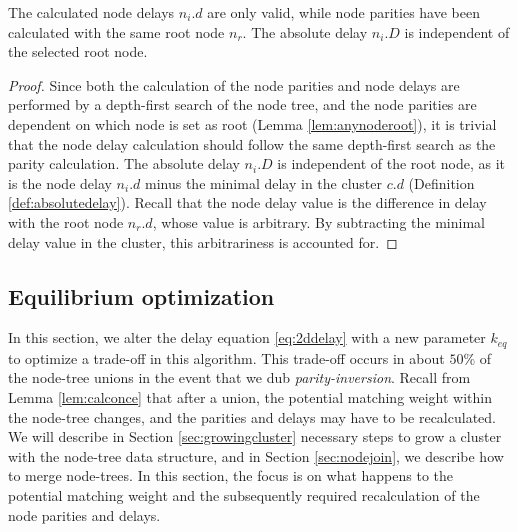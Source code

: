\begin{lemma}\label{lem:nodecalc_ancestrypath}
  The calculated node delays $n_i.d$ are only valid, while node parities have been calculated with the same root node $n_r$. The absolute delay $n_i.D$ is independent of the selected root node. 
\end{lemma}
\begin{proof}
  Since both the calculation of the node parities and node delays are performed by a depth-first search of the node tree, and the node parities are dependent on which node is set as root (Lemma \ref{lem:anynoderoot}), it is trivial that the node delay calculation should follow the same depth-first search as the parity calculation. The absolute delay $n_i.D$ is independent of the root node, as it is the node delay $n_i.d$ minus the minimal delay in the cluster $c.d$ (Definition \ref{def:absolutedelay}). Recall that the node delay value is the difference in delay with the root node $n_r.d$, whose value is arbitrary. By subtracting the minimal delay value in the cluster, this arbitrariness is accounted for. 
\end{proof}



\subsection{Equilibrium optimization}\label{sec:eqstate}

In this section, we alter the delay equation \eqref{eq:2ddelay} with a new parameter $k_{eq}$ to optimize a trade-off in this algorithm. This trade-off occurs in about $50\%$ of the node-tree unions in the event that we dub \emph{parity-inversion}. Recall from Lemma \ref{lem:calconce} that after a union, the potential matching weight within the node-tree changes, and the parities and delays may have to be recalculated. We will describe in Section \ref{sec:growingcluster} necessary steps to grow a cluster with the node-tree data structure, and in Section \ref{sec:nodejoin}, we describe how to merge node-trees. In this section, the focus is on what happens to the potential matching weight and the subsequently required recalculation of the node parities and delays. 

